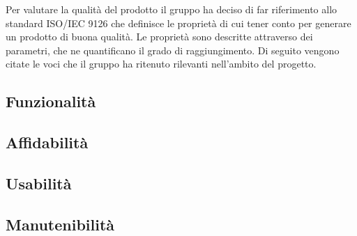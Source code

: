 Per valutare la qualità del prodotto il gruppo ha deciso di far riferimento allo standard ISO/IEC 9126\glo 
che definisce le proprietà di cui tener conto per generare un prodotto di buona qualità. 
Le proprietà sono descritte attraverso dei parametri, che ne quantificano il grado di raggiungimento. 
Di seguito vengono citate le voci che il gruppo ha ritenuto rilevanti nell’ambito del progetto.

\subsection{Funzionalità}


\subsection{Affidabilità}


\subsection{Usabilità}


\subsection{Manutenibilità}
